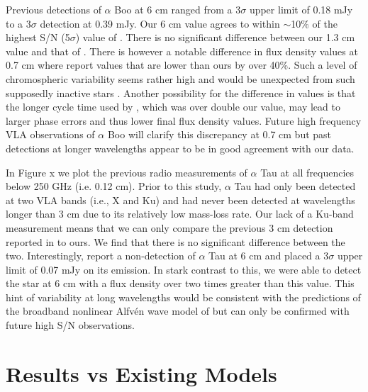 Previous detections of $\alpha$ Boo at 6 cm ranged from a 3$\sigma$ upper limit of 0.18 mJy to a 3$\sigma$ detection at 0.39 mJy. Our 6 cm value agrees to within $\sim$10$\%$ of the highest S/N (5$\sigma$) value of \cite{drake_1986}. There is no significant difference between our 1.3 cm value and that of \cite{dehaes_2011}. There is however a notable difference in flux density values at 0.7 cm  where \cite{dehaes_2011} report values that are lower than ours by over 40\%. Such a level of chromospheric variability seems rather high and would be unexpected from such supposedly inactive stars \citep{harper_2013}. Another possibility for the difference in values is that the longer cycle time used by \cite{dehaes_2011}, which was over double our value, may lead to larger phase errors and thus lower final flux density values. Future high frequency VLA observations of $\alpha$ Boo will clarify this discrepancy at 0.7 cm but past detections at longer wavelengths appear to be in good agreement with our data.

In Figure x we plot the previous  radio measurements of $\alpha$ Tau at all frequencies below 250 GHz (i.e. 0.12 cm). Prior to this study, $\alpha$ Tau had only been detected at two VLA bands (i.e., X and Ku) and had never been detected at wavelengths longer than 3 cm due to its relatively low mass-loss rate. Our lack of a Ku-band measurement means that we can only compare the previous 3 cm detection reported in \cite{wood_2007} to ours. We find that there is no significant difference between the two. Interestingly, \cite{wood_2007} report a non-detection of $\alpha$ Tau at 6 cm and placed a 3$\sigma$ upper limit of 0.07 mJy on its emission. In stark contrast to this, we were able to detect the star at 6 cm with a flux density over two times greater than this value. This hint of variability at long wavelengths would be consistent with the predictions of the broadband nonlinear Alfv\'{e}n wave model of \cite{airapetian_2010} but can only be confirmed with future high S/N observations.
\section{Results vs Existing Models}\label{sec:6.5}

